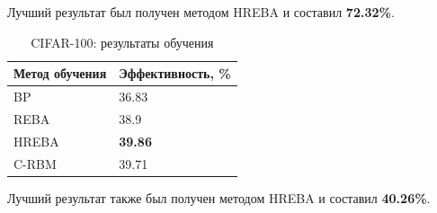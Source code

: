 Лучший результат был получен методом HREBA и составил \textbf{72.32\%}.

\begin{table} [!h]
  \centering
  \caption{CIFAR-100: результаты обучения}\label{table:cifar_100_results}
  \begin{tabular}{| p{6cm} | p{6cm} |}
    \hline
      \textbf{Метод обучения} & \textbf{Эффективность, \%}\\
      \hline
      BP & 36.83\\
      \hline
      REBA & 38.9\\
      \hline
      HREBA & \textbf{39.86}\\
      \hline
      C-RBM & 39.71\\
      \hline
  \end{tabular}
\end{table}

Лучший результат также был получен методом HREBA и составил \textbf{40.26\%}.





